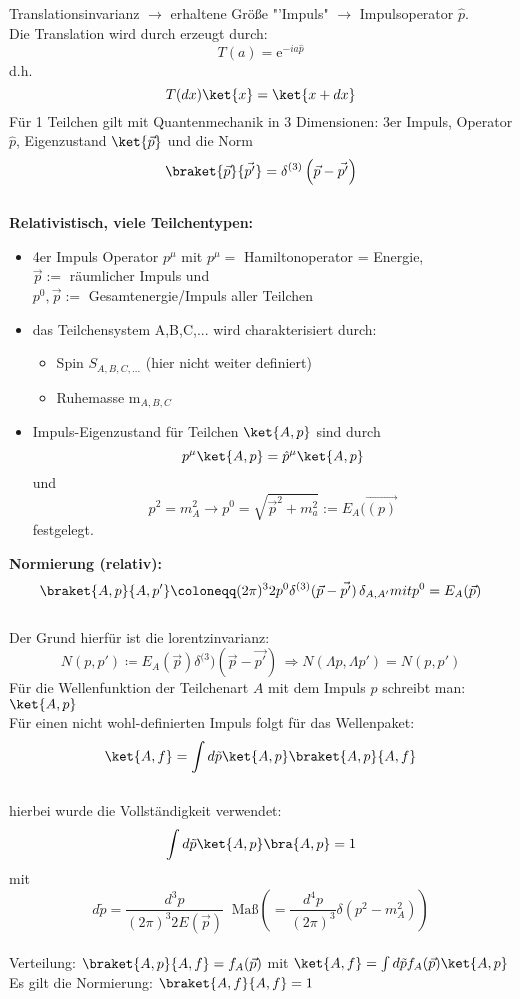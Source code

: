 Translationsinvarianz $\rightarrow$ erhaltene Größe "'Impuls" $\rightarrow$ 
Impulsoperator $\hat p$. \\
Die Translation wird durch erzeugt durch:
\[ T(a) = \mathrm e^{-ia \hat p} \]
d.h. 
\[ T(dx) \ket{x} = \ket{x+dx} \]
Für 1 Teilchen gilt mit Quantenmechanik in 3 Dimensionen: 3er Impuls, Operator 
$\hat p$, Eigenzustand $\ket{\vec{p}}$ und die Norm 
\[ \braket{\vec{p}}{\vec{p'}} = \delta^{(3)} \left( \vec{p} - \vec{p'} \right) 
\]
\\
\textbf{Relativistisch, viele Teilchentypen:}\\
\begin{itemize}
\item 4er Impuls Operator $p^{\mu}$ 
mit $p^{\mu} =$ Hamiltonoperator = Energie, \\
$\vec{p} :=$ räumlicher Impuls und \\
$p^0, \vec{p} :=$ Gesamtenergie/Impuls aller Teilchen
\item das Teilchensystem A,B,C,... wird charakterisiert durch: \begin{itemize}
\item Spin $S_{A,B,C,...}$ (hier nicht weiter definiert)
\item Ruhemasse m$_{A,B,C}$
\end{itemize}
\item Impuls-Eigenzustand für Teilchen $\ket{A,p}$ sind durch 
\[ p^{\mu} \ket{A,p} = \hat{p}^{\mu} \ket{A,p} \] und 
\[ p^2 = m_A^2 \to p^0 = \sqrt{\vec{p}^2 + m_a^2} := E_A(\vec{(p)} \] 
festgelegt.
\end{itemize}
\textbf{Normierung (relativ):} \\
\[ \braket{A,p}{A,p'}  \coloneqq  (2 \pi)^3 2 p^0 
\delta^{(3)}(\vec{p}-\vec{p'})\, \delta_{A,A'} mit p^0 =E_A(\vec{p}) \] \\ 
Der Grund hierfür ist die lorentzinvarianz: \[N(p,p') \coloneqq E_A(\vec{p}) 
\delta^{(3})(\vec{p}-\vec{p'}) \, \Rightarrow N(\Lambda p,\Lambda p') = N(p,p') 
\] 
Für die Wellenfunktion der Teilchenart $A$ mit dem Impuls $p$ schreibt man: 
$\ket{A,p}$ \\
Für einen nicht wohl-definierten Impuls folgt für das Wellenpaket: \\
\[\ket{A,f} = \int d \tilde{p} \ket{A,p} \braket{A,p}{A,f}\] \\
hierbei wurde die Vollständigkeit verwendet: 
\[\int d \tilde{p} \ket{A,p} \bra{A,p} = 1 \] 
mit \\
\[d \tilde{p} = \frac{d^3 p}{(2 \pi)^3 2 E(\vec{p})} \; \; \text{Maß} \left(= 
\frac{d^4 p}{(2 \pi)^3} \delta(p^2-m_A^2) \right)\] \\
Verteilung: $ \braket{A,p}{A,f} = f_A(\vec{p})$ mit $\ket{A,f} = \int d 
\tilde{p} f_A (\vec{p}) \ket{A,p}$ \\
Es gilt die Normierung: $\braket{A,f}{A,f}=1$ \\ \\

